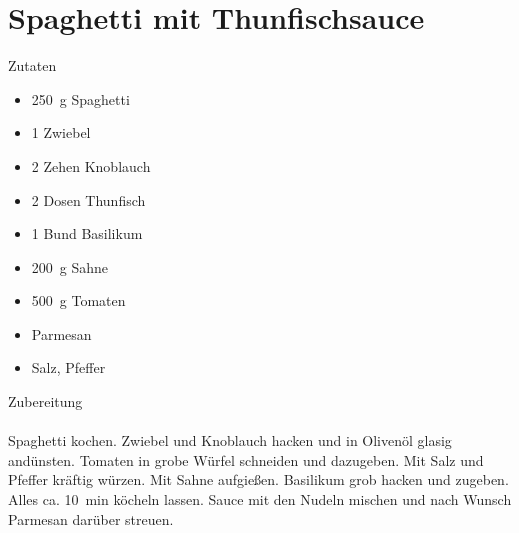 \section*{Spaghetti mit Thunfischsauce}
\ihead{}\ohead{}
\cfoot{}
{\Large Zutaten}
\begin{multicols}{2}
\begin{itemize}
    \item \SI{250}{g} Spaghetti
    \item \num{1} Zwiebel
    \item \num{2} Zehen Knoblauch
    \item \num{2} Dosen Thunfisch
    \item \num{1} Bund Basilikum
    \item \SI{200}{g} Sahne
    \item \SI{500}{g} Tomaten
    \item Parmesan
    \item Salz, Pfeffer
\end{itemize}
\end{multicols}
\noindent
{\Large Zubereitung}\\
\\
Spaghetti kochen.
Zwiebel und Knoblauch hacken und in Olivenöl glasig andünsten.
Tomaten in grobe Würfel schneiden und dazugeben.
Mit Salz und Pfeffer kräftig würzen.
Mit Sahne aufgießen.
Basilikum grob hacken und zugeben.
Alles ca. \SI{10}{min} köcheln lassen.
Sauce mit den Nudeln mischen und nach Wunsch Parmesan darüber streuen.